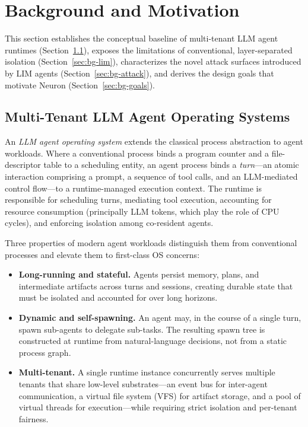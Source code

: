 \section{Background and Motivation}
\label{sec:bg}

This section establishes the conceptual baseline of multi-tenant LLM agent
runtimes (Section~\ref{sec:bg-kernel}), exposes the limitations of conventional,
layer-separated isolation (Section~\ref{sec:bg-lim}), characterizes the novel attack
surfaces introduced by LIM agents (Section~\ref{sec:bg-attack}), and derives the
design goals that motivate Neuron (Section~\ref{sec:bg-goals}).

\subsection{Multi-Tenant LLM Agent Operating Systems}
\label{sec:bg-kernel}

An \emph{LLM agent operating system} extends the classical process abstraction
to agent workloads. Where a conventional process binds a program counter and a
file-descriptor table to a scheduling entity, an agent process binds a
\emph{turn}---an atomic interaction comprising a prompt, a sequence of tool
calls, and an LLM-mediated control flow---to a runtime-managed execution
context. The runtime is responsible for scheduling turns, mediating tool
execution, accounting for resource consumption (principally LLM tokens, which
play the role of CPU cycles), and enforcing isolation among co-resident
agents.

Three properties of modern agent workloads distinguish them from conventional
processes and elevate them to first-class OS concerns:

\begin{itemize}
    \item \textbf{Long-running and stateful.} Agents persist memory, plans, and
    intermediate artifacts across turns and sessions, creating durable state
    that must be isolated and accounted for over long horizons.
    \item \textbf{Dynamic and self-spawning.} An agent may, in the course of a
    single turn, spawn sub-agents to delegate sub-tasks. The resulting spawn
    tree is constructed at runtime from natural-language decisions, not from a
    static process graph.
    \item \textbf{Multi-tenant.} A single runtime instance concurrently serves
    multiple tenants that share low-level substrates---an event bus for
    inter-agent communication, a virtual file system (VFS) for artifact
    storage, and a pool of virtual threads for execution---while requiring
    strict isolation and per-tenant fairness.
\end{itemize}

